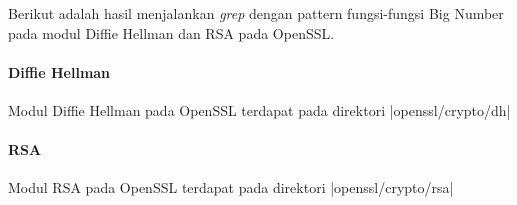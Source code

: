  \label{sec:bn_func_call}
Berikut adalah hasil menjalankan \textit{grep} dengan pattern fungsi-fungsi Big Number pada modul Diffie Hellman dan RSA pada OpenSSL. 

\paragraph{Diffie Hellman}
Modul Diffie Hellman pada OpenSSL terdapat pada direktori |openssl/crypto/dh|


\paragraph{RSA}
Modul RSA pada OpenSSL terdapat pada direktori |openssl/crypto/rsa|

